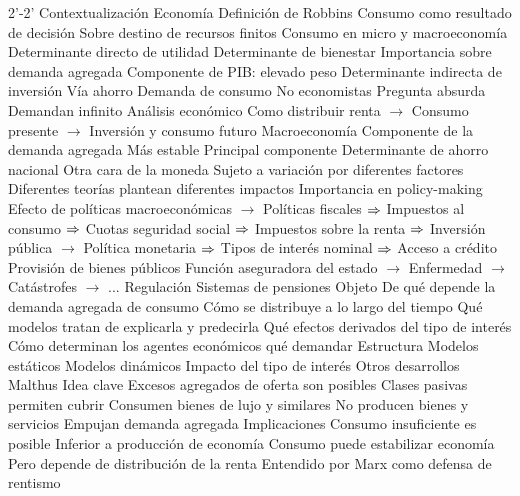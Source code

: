 \documentclass{nuevotema}
\begin{document}
\begin{esquemal}
	\1[]  2'-2'
		\2 Contextualización
			\3 Economía
				\4 Definición de Robbins
				\4 Consumo como resultado de decisión
				\4[] Sobre destino de recursos finitos
			\3 Consumo en micro y macroeconomía
				\4 Determinante directo de utilidad
				\4[] Determinante de bienestar
				\4 Importancia sobre demanda agregada
				\4[] Componente de PIB: elevado peso
				\4[] Determinante indirecta de inversión
				\4[] Vía ahorro
			\3 Demanda de consumo
				\4 No economistas
				\4[] Pregunta absurda
				\4[] Demandan infinito
				\4 Análisis económico
				\4[] Como distribuir renta
				\4[] $\to$ Consumo presente
				\4[] $\to$ Inversión y consumo futuro
			\3 Macroeconomía
				\4 Componente de la demanda agregada
				\4[] Más estable
				\4[] Principal componente
				\4 Determinante de ahorro nacional
				\4[] Otra cara de la moneda
				\4 Sujeto a variación por diferentes factores
				\4[] Diferentes teorías plantean diferentes impactos
			\3 Importancia en policy-making
				\4 Efecto de políticas macroeconómicas
				\4[] $\to$ Políticas fiscales
				\4[] $\Rightarrow$ Impuestos al consumo
				\4[] $\Rightarrow$ Cuotas seguridad social
				\4[] $\Rightarrow$ Impuestos sobre la renta
				\4[] $\Rightarrow$ Inversión pública
				\4[] $\to$ Política monetaria
				\4[] $\Rightarrow$ Tipos de interés nominal
				\4[] $\Rightarrow$ Acceso a crédito
				\4 Provisión de bienes públicos
				\4[] Función aseguradora del estado
				\4[] $\to$ Enfermedad
				\4[] $\to$ Catástrofes
				\4[] $\to$ ...
				\4 Regulación
				\4[] Sistemas de pensiones
		\2 Objeto
			\3 De qué depende la demanda agregada de consumo
			\3 Cómo se distribuye a lo largo del tiempo
			\3 Qué modelos tratan de explicarla y predecirla
			\3 Qué efectos derivados del tipo de interés
			\3 Cómo determinan los agentes económicos qué demandar
		\2 Estructura
			\3 Modelos estáticos
			\3 Modelos dinámicos
			\3 Impacto del tipo de interés
			\3 Otros desarrollos
	\1 
		\2 Malthus
			\3 Idea clave
				\4 Excesos agregados de oferta son posibles
				\4 Clases pasivas permiten cubrir
				\4[] Consumen bienes de lujo y similares
				\4[] No producen bienes y servicios
				\4[] Empujan demanda agregada
			\3 Implicaciones
				\4 Consumo insuficiente es posible
				\4[] Inferior a producción de economía
				\4 Consumo puede estabilizar economía
				\4[] Pero depende de distribución de la renta
				\4 Entendido por Marx como defensa de rentismo
				

\end{esquemal}
\end{document}
